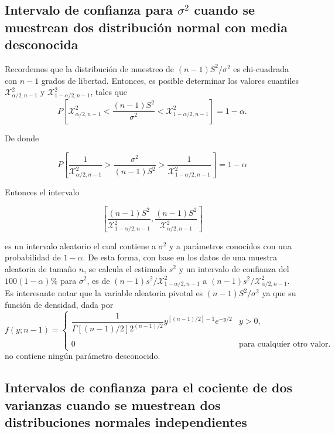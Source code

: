 \subsection{Intervalo de confianza para \boldmath $\sigma^2$ cuando se muestrean dos distribución normal con media desconocida}
Recordemos que la distribución de muestreo de $(n-1)S^2/\sigma^2$ es chi-cuadrada con $n-1$ grados de libertad. Entonces, es posible determinar los valores cuantiles $\mathcal{X}^2_{\alpha/2,n-1}$ y $\mathcal{X}^2_{1-\alpha/2,n-1}$, tales que
$$P\left[\mathcal{X}^2_{\alpha/2,n-1}<\dfrac{(n-1)S^2}{\sigma^2}<\mathcal{X}^2_{1-\alpha/2,n-1}\right]=1-\alpha.$$

De donde 

$$P\left[\dfrac{1}{\mathcal{X}^2_{\alpha/2,n-1}}>\dfrac{\sigma^2}{(n-1)S^2}>\dfrac{1}{\mathcal{X}^2_{1-\alpha/2,n-1}}\right] = 1-\alpha$$

Entonces el intervalo

$$\left[\dfrac{(n-1)S^2}{\mathcal{X}^2_{1-\alpha/2,n-1}},\dfrac{(n-1)S^2}{\mathcal{X}^2_{\alpha/2,n-1}}\right]$$

es un intervalo aleatorio el cual contiene a $\sigma^2$ y a parámetros conocidos con una probabilidad de $1-\alpha$. De esta forma, con base en los datos de una muestra aleatoria de tamaño $n$, se calcula el estimado $s^2$ y un intervalo de confianza del $100(1-\alpha)\%$ para $\sigma^2$, es de $(n-1)s^2/\mathcal{X}_{1-\alpha/2,n-1}^2$ a $(n-1)s^2/\mathcal{X}_{\alpha/2,n-1}^2$. Es interesante notar que la variable aleatoria pivotal es $(n-1)S^2/\sigma^2$ ya que su función de densidad, dada por
$$
f(y;n-1)=
\left\{
    \begin{array}{lc}
	\dfrac{1}{\Gamma\left[(n-1)/2\right]2^{(n-1)/2}}y^{\left[(n-1)/2\right]-1}e^{-y/2} & y>0,\\\\
	0&\mbox{para cualquier otro valor.}
    \end{array}
\right.
$$
no contiene ningún parámetro desconocido.\\


\subsection{Intervalos de confianza para el cociente de dos varianzas cuando se muestrean dos distribuciones normales independientes}

